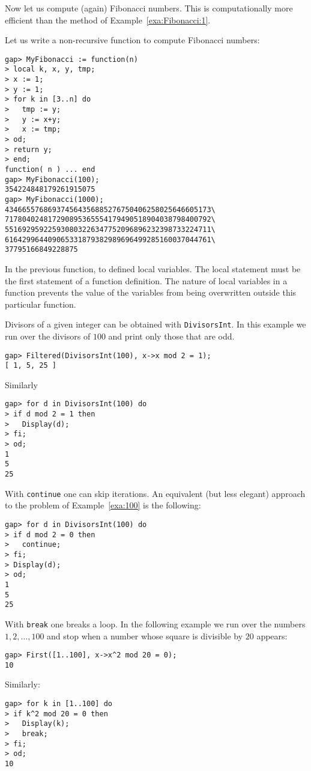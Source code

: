 Now let us compute (again) Fibonacci numbers. This is computationally 
more efficient 
than the method of
Example~\ref{exa:Fibonacci:1}. 

\begin{example}
\label{exa:Fibonacci:2}
Let us write a non-recursive function to compute Fibonacci numbers: 
\begin{lstlisting}
gap> MyFibonacci := function(n)                                                 
> local k, x, y, tmp;
> x := 1;
> y := 1;
> for k in [3..n] do
>   tmp := y;
>   y := x+y;
>   x := tmp;
> od; 
> return y;
> end;
function( n ) ... end
gap> MyFibonacci(100);
354224848179261915075
gap> MyFibonacci(1000);
434665576869374564356885276750406258025646605173\
717804024817290895365554179490518904038798400792\
551692959225930803226347752096896232398733224711\
616429964409065331879382989696499285160037044761\
37795166849228875
\end{lstlisting}
In the previous function, to defined 
local variables. 
The local statement must be the first statement of a function definition. The nature of local variables in a function  prevents the value of the variables from being overwritten outside this particular function.
\end{example}

\begin{example}
\label{exa:100}
Divisors of a given integer can be obtained with \lstinline{DivisorsInt}.  In this
example we run over the divisors of $100$ and print only those that are
odd.
\begin{lstlisting}
gap> Filtered(DivisorsInt(100), x->x mod 2 = 1);
[ 1, 5, 25 ]
\end{lstlisting}
Similarly 
\begin{lstlisting}
gap> for d in DivisorsInt(100) do
> if d mod 2 = 1 then
>   Display(d);
> fi;
> od;
1
5
25
\end{lstlisting}
With \lstinline{continue} one can skip iterations. An equivalent (but less
elegant) approach to the problem of Example~\ref{exa:100} is the following:
\begin{lstlisting}
gap> for d in DivisorsInt(100) do
> if d mod 2 = 0 then
>   continue;
> fi;
> Display(d);
> od;
1
5
25
\end{lstlisting}
\end{example}

With \lstinline{break} one breaks a loop. In the following example we run over
the numbers $1,2,\dots,100$ and stop when a number whose square is divisible by
$20$ appears:
\begin{lstlisting}
gap> First([1..100], x->x^2 mod 20 = 0);
10
\end{lstlisting}
Similarly:
\begin{lstlisting}
gap> for k in [1..100] do
> if k^2 mod 20 = 0 then
>   Display(k);
>   break;
> fi;
> od;
10
\end{lstlisting}

